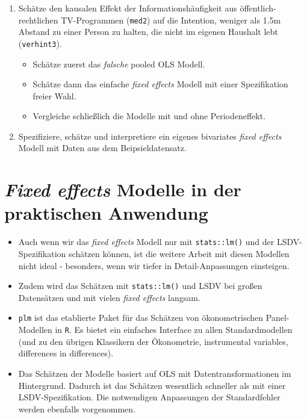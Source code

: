 \documentclass[]{book}
\providecommand{\tightlist}{%
  \setlength{\itemsep}{0pt}\setlength{\parskip}{0pt}}
\begin{document}
\begin{enumerate}
\def\labelenumi{\arabic{enumi})}
\tightlist
\item
  Schätze den kausalen Effekt der Informationshäufigkeit aus öffentlich-rechtlichen TV-Programmen (\texttt{med2}) auf die Intention, weniger als 1.5m Abstand zu einer Person zu halten, die nicht im eigenen Haushalt lebt (\texttt{verhint3}).

  \begin{itemize}
  \tightlist
  \item
    Schätze zuerst das \emph{falsche} pooled OLS Modell.
  \item
    Schätze dann das einfache \emph{fixed effects} Modell mit einer Spezifikation freier Wahl.
  \item
    Vergleiche schließlich die Modelle mit und ohne Periodeneffekt.
  \end{itemize}
\item
  Spezifiziere, schätze und interpretiere ein eigenes bivariates \emph{fixed effects} Modell mit Daten aus dem Beipsieldatensatz.
\end{enumerate}

\hypertarget{fixed-effects-modelle-in-der-praktischen-anwendung}{%
\section{\texorpdfstring{\emph{Fixed effects} Modelle in der praktischen Anwendung}{Fixed effects Modelle in der praktischen Anwendung}}\label{fixed-effects-modelle-in-der-praktischen-anwendung}}

\begin{itemize}
\tightlist
\item
  Auch wenn wir das \emph{fixed effects} Modell nur mit \texttt{stats::lm()} und der LSDV-Spezifikation schätzen können, ist die weitere Arbeit mit diesen Modellen nicht ideal - besonders, wenn wir tiefer in Detail-Anpassungen einsteigen.
\item
  Zudem wird das Schätzen mit \texttt{stats::lm()} und LSDV bei großen Datensätzen und mit vielen \emph{fixed effects} langsam.
\item
  \texttt{plm} \citep{R-plm} ist das etablierte Paket für das Schätzen von ökonometrischen Panel-Modellen in \texttt{R}. Es bietet ein einfaches Interface zu allen Standardmodellen (und zu den übrigen Klassikern der Ökonometrie, instrumental variables, differences in differences).
\item
  Das Schätzen der Modelle basiert auf OLS mit Datentransformationen im Hintergrund. Dadurch ist das Schätzen wesentlich schneller als mit einer LSDV-Spezifikation. Die notwendigen Anpassungen der Standardfehler werden ebenfalls vorgenommen.
\end{itemize}
\end{document}
